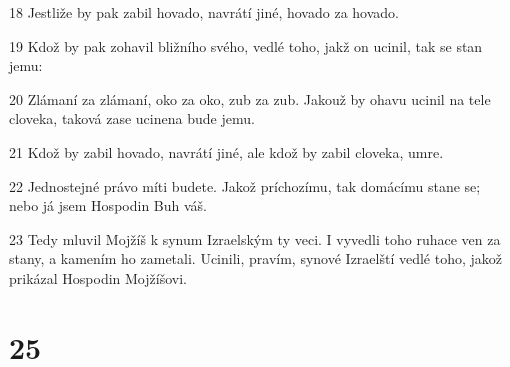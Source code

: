 \par 18 Jestliže by pak zabil hovado, navrátí jiné, hovado za hovado.
\par 19 Kdož by pak zohavil bližního svého, vedlé toho, jakž on ucinil, tak se stan jemu:
\par 20 Zlámaní za zlámaní, oko za oko, zub za zub. Jakouž by ohavu ucinil na tele cloveka, taková zase ucinena bude jemu.
\par 21 Kdož by zabil hovado, navrátí jiné, ale kdož by zabil cloveka, umre.
\par 22 Jednostejné právo míti budete. Jakož príchozímu, tak domácímu stane se; nebo já jsem Hospodin Buh váš.
\par 23 Tedy mluvil Mojžíš k synum Izraelským ty veci. I vyvedli toho ruhace ven za stany, a kamením ho zametali. Ucinili, pravím, synové Izraelští vedlé toho, jakož prikázal Hospodin Mojžíšovi.

\chapter{25}

